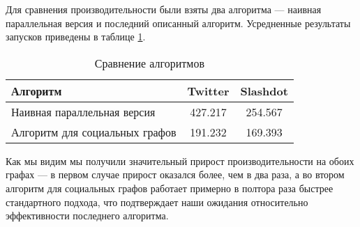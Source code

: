 \FloatBarrier

Для сравнения производительности были взяты два алгоритма --- наивная параллельная версия и последний описанный алгоритм. Усредненные результаты запусков приведены в таблице \ref{table:algo_floyd_comparison}.   


\FloatBarrier
\begin{table}[H]
\centering
\caption{Сравнение алгоритмов}

\begin{tabular}{l|c|c} 
\hline 
Алгоритм & Twitter & Slashdot\\
\hline\hline
Наивная параллельная версия & 427.217 & 254.567 \\  
Алгоритм для социальных графов & 191.232 & 169.393  \\
\hline
\end{tabular}

\label {table:algo_floyd_comparison}
\end{table}
\FloatBarrier

Как мы видим мы получили значительный прирост производительности на обоих графах --- в первом случае прирост оказался более, чем в два раза, а во втором алгоритм для социальных графов работает примерно в полтора раза быстрее стандартного подхода, что подтверждает наши ожидания относительно эффективности последнего алгоритма.

